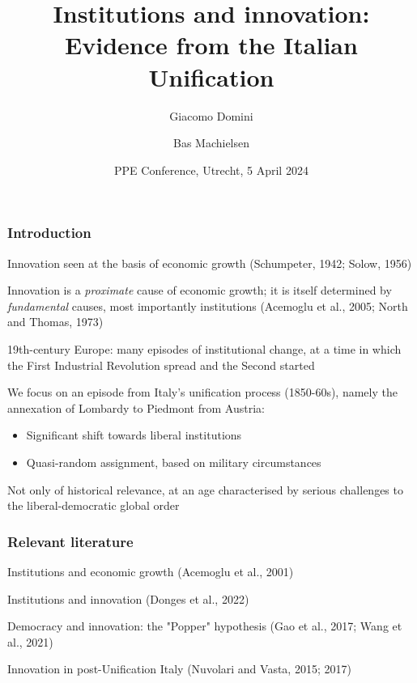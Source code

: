 \documentclass[10pt]{beamer}
\title[Institutions and innovation]{Institutions and innovation: \\ Evidence from the Italian Unification}
\author[Domini \& Machielsen]{Giacomo Domini\inst{} 
    \and Bas Machielsen\inst{}}
\institute{
    \inst{} Utrecht University School of Economics}
\date[April 2024]{PPE Conference, Utrecht, 5 April 2024}
\begin{document}
\begin{frame}
  \titlepage
\end{frame}

\begin{frame}
    \frametitle{Introduction}
    
    Innovation seen at the basis of economic growth (Schumpeter, 1942; Solow, 1956) \\  \bigskip
    
    Innovation is a \textit{proximate} cause of economic growth; it is itself determined by \textit{fundamental} causes, most importantly institutions (Acemoglu  et al., 2005; North and Thomas, 1973) \\    \bigskip
    
    \pause
    
    19th-century Europe: many episodes of institutional change, at a time in which the First Industrial Revolution spread and the Second  started \\    \bigskip

    We focus on an episode from Italy's unification process (1850-60s), namely the annexation of Lombardy to Piedmont from Austria:
    
    \begin{itemize}
        \item Significant shift towards liberal institutions
        \item Quasi-random assignment, based on military circumstances
    \end{itemize}

    \bigskip
    
    Not only of historical relevance, at an age characterised by serious challenges to the liberal-democratic global order 
    
\end{frame}

\begin{frame}
    \frametitle{Relevant literature}
    
    Institutions and economic growth (Acemoglu et al., 2001) \\  \bigskip

    Institutions and innovation (Donges et al., 2022) \\  \bigskip

    Democracy and innovation: the "Popper" hypothesis (Gao et al., 2017; Wang et al., 2021) \\  \bigskip

    Innovation in post-Unification Italy (Nuvolari and Vasta, 2015; 2017)
    
\end{frame}
\end{document}
